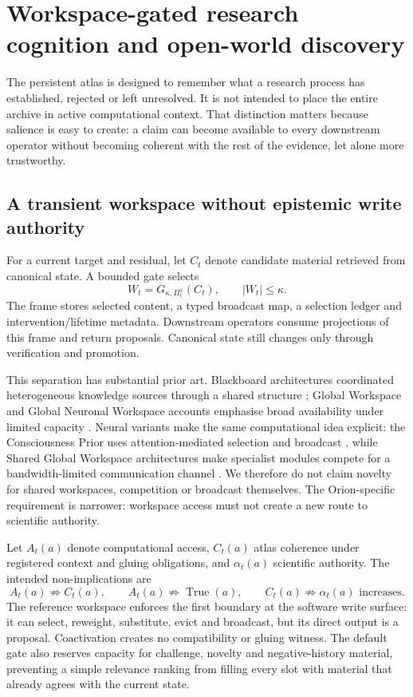 \section{Workspace-gated research cognition and open-world discovery}

The persistent atlas is designed to remember what a research process has established, rejected or left unresolved. It is not intended to place the entire archive in active computational context. That distinction matters because salience is easy to create: a claim can become available to every downstream operator without becoming coherent with the rest of the evidence, let alone more trustworthy.

\subsection{A transient workspace without epistemic write authority}

For a current target and residual, let \(C_t\) denote candidate material retrieved from canonical state. A bounded gate selects
\[
W_t=G_{\kappa,\Pi_t^x}(C_t),\qquad |W_t|\leq\kappa .
\]
The frame stores selected content, a typed broadcast map, a selection ledger and intervention/lifetime metadata. Downstream operators consume projections of this frame and return proposals. Canonical state still changes only through verification and promotion.

This separation has substantial prior art. Blackboard architectures coordinated heterogeneous knowledge sources through a shared structure \cite{hayesroth1985,nii1986}; Global Workspace and Global Neuronal Workspace accounts emphasise broad availability under limited capacity \cite{dehaene2001,mashour2020}. Neural variants make the same computational idea explicit: the Consciousness Prior uses attention-mediated selection and broadcast \cite{bengio2017}, while Shared Global Workspace architectures make specialist modules compete for a bandwidth-limited communication channel \cite{goyal2021}. We therefore do not claim novelty for shared workspaces, competition or broadcast themselves. The Orion-specific requirement is narrower: workspace access must not create a new route to scientific authority.

Let \(A_t(a)\) denote computational access, \(C_t(a)\) atlas coherence under registered context and gluing obligations, and \(\alpha_t(a)\) scientific authority. The intended non-implications are
\[
A_t(a)\not\Rightarrow C_t(a),\qquad
A_t(a)\not\Rightarrow \operatorname{True}(a),\qquad
C_t(a)\not\Rightarrow \alpha_t(a)\text{ increases}.
\]
The reference workspace enforces the first boundary at the software write surface: it can select, reweight, substitute, evict and broadcast, but its direct output is a proposal. Coactivation creates no compatibility or gluing witness. The default gate also reserves capacity for challenge, novelty and negative-history material, preventing a simple relevance ranking from filling every slot with material that already agrees with the current state.

